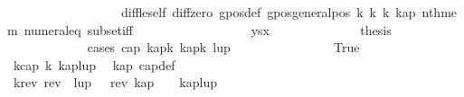 \begin{isabellebody}
\ \ \ \ \ \ \ \ \ \ \ \ \ \ \ \ \ \ diff{\isacharunderscore}{\kern0pt}le{\isacharunderscore}{\kern0pt}self\ diff{\isacharunderscore}{\kern0pt}zero\ gpos{\isacharunderscore}{\kern0pt}def\ gpos{\isacharunderscore}{\kern0pt}generalpos\ k{}\ k{}\ k{}\ kap{\isacharparenleft}{\kern0pt}{}{\isacharparenright}{\kern0pt}\ nth{\isacharunderscore}{\kern0pt}mem\ numeral{\isacharunderscore}{\kern0pt}{}{\isacharunderscore}{\kern0pt}eq{\isacharunderscore}{\kern0pt}{}\ subset{\isacharunderscore}{\kern0pt}iff\isanewline
\ \ \ \ \ \ \ \ \ \ \ \ \ \ \ \ \ \ ysx{\isacharparenright}{\kern0pt}\isanewline
\isanewline
\ \ \ \ \ \ \ \ \ \ \ \ \isamarkupfalse%
\ {\isacharquery}{\kern0pt}thesis\isanewline
\ \ \ \ \ \ \ \ \ \ \ \ \isamarkupfalse%
{\isacharparenleft}{\kern0pt}cases\ {\isachardoublequoteopen}cap{}\ {\isacharparenleft}{\kern0pt}kap{\isacharbang}{\kern0pt}{\isacharparenleft}{\kern0pt}k{\isacharminus}{\kern0pt}{}{\isacharparenright}{\kern0pt}{\isacharparenright}{\kern0pt}\ {\isacharparenleft}{\kern0pt}kap{\isacharbang}{\kern0pt}{\isacharparenleft}{\kern0pt}k{\isacharminus}{\kern0pt}{}{\isacharparenright}{\kern0pt}{\isacharparenright}{\kern0pt}\ {\isacharparenleft}{\kern0pt}lup{\isacharbang}{\kern0pt}{}{\isacharparenright}{\kern0pt}{\isachardoublequoteclose}{\isacharparenright}{\kern0pt}\isanewline
\isanewline
\ \ \ \ \ \ \ \ \ \ \ \ \ \ \isamarkupfalse%
\ True\isanewline
\ \ \ \ \ \ \ \ \ \ \ \ \ \ \isamarkupfalse%
\ k{}{\isacharcolon}{\kern0pt}{\isachardoublequoteopen}cap\ k\ {\isacharparenleft}{\kern0pt}kap{\isacharat}{\kern0pt}{\isacharbrackleft}{\kern0pt}lup{\isacharbang}{\kern0pt}{}{\isacharbrackright}{\kern0pt}{\isacharparenright}{\kern0pt}{\isachardoublequoteclose}\ \isamarkupfalse%
\ kap\ cap{\isacharunderscore}{\kern0pt}def\isanewline
\ \ \ \ \ \ \ \ \ \ \ \ \ \ \isamarkupfalse%
{\isacharminus}{\kern0pt}\isanewline
\isanewline
\ \ \ \ \ \ \ \ \ \ \ \ \ \ \ \ \isamarkupfalse%
\ k{\isacharunderscore}{\kern0pt}rev{\isacharcolon}{\kern0pt}\ {\isachardoublequoteopen}rev\ {\isacharparenleft}{\kern0pt}\ {\isacharparenleft}{\kern0pt}lup{\isacharbang}{\kern0pt}{}{\isacharparenright}{\kern0pt}\ {\isacharhash}{\kern0pt}\ {\isacharparenleft}{\kern0pt}\ rev\ kap\ {\isacharparenright}{\kern0pt}\ {\isacharparenright}{\kern0pt}\ {\isacharequal}{\kern0pt}\ {\isacharparenleft}{\kern0pt}kap{\isacharat}{\kern0pt}{\isacharbrackleft}{\kern0pt}lup{\isacharbang}{\kern0pt}{}{\isacharbrackright}{\kern0pt}{\isacharparenright}{\kern0pt}{\isachardoublequoteclose}\ \isamarkupfalse%

\end{isabellebody}
